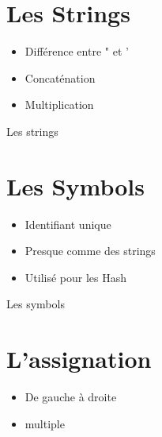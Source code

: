 \documentclass{beamer}
\begin{document}
\section{Les Strings}

\begin{frame}
  \begin{itemize}
    \item Diff\'erence entre " et '
    \item Concat\'enation
    \item Multiplication
  \end{itemize}
\end{frame}

\begin{frame}
  \begin{beamerboxesrounded}{Les strings}
    
  \end{beamerboxesrounded}
\end{frame}

\section{Les Symbols}

\begin{frame}
  \begin{itemize}
    \item Identifiant unique
    \item Presque comme des strings
    \item Utilis\'e  pour les Hash
  \end{itemize}
\end{frame}

\begin{frame}
  \begin{beamerboxesrounded}{Les symbols}
    
  \end{beamerboxesrounded}
\end{frame}


\section{L'assignation}

\begin{frame}
  \begin{itemize}
    \item De gauche à droite
    \item multiple
  \end{itemize}
\end{frame}
\end{document}
